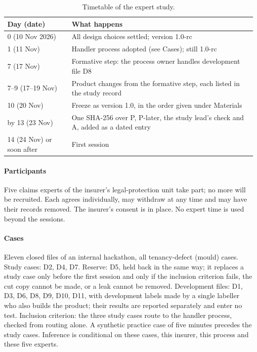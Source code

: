 \begin{table}[h]
\caption{Timetable of the expert study.}
\label{tab:protocol-timeline}
\footnotesize
\begin{tabularx}{\linewidth}{@{}lX@{}}
\toprule
Day (date) & What happens \\
\midrule
0 (10 Nov 2026) & All design choices settled; version 1.0-rc \\
1 (11 Nov) & Handler process adopted (see Cases); still 1.0-rc \\
7 (17 Nov) & Formative step: the process owner handles development file D8 \\
7--9 (17--19 Nov) & Product changes from the formative step, each listed in the study record \\
10 (20 Nov) & Freeze as version 1.0, in the order given under Materials \\
by 13 (23 Nov) & One SHA-256 over P, P-later, the study lead's check and A, added as a dated entry \\
14 (24 Nov) or soon after & First session \\
\bottomrule
\end{tabularx}
\end{table}

\paragraph{Participants}
Five claims experts of the insurer's legal-protection unit take part; no more will be recruited. Each agrees individually, may withdraw at any time and may have their records removed. The insurer's consent is in place. No expert time is used beyond the sessions.


\paragraph{Cases}
Eleven closed files of an internal hackathon, all tenancy-defect (mould) cases. Study cases: D2, D4, D7. Reserve: D5, held back in the same way; it replaces a study case only before the first session and only if the inclusion criterion fails, the cut copy cannot be made, or a leak cannot be removed. Development files: D1, D3, D6, D8, D9, D10, D11, with development labels made by a single labeller who also builds the product; their results are reported separately and enter no test. Inclusion criterion: the three study cases route to the handler process, checked from routing alone. A synthetic practice case of five minutes precedes the study cases. Inference is conditional on these cases, this insurer, this process and these five experts.

